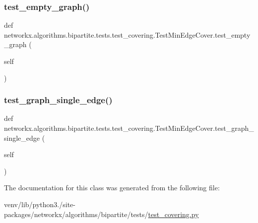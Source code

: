 \subsubsection{\texorpdfstring{test\+\_\+empty\+\_\+graph()}{test\_empty\_graph()}}
{\footnotesize\ttfamily def networkx.\+algorithms.\+bipartite.\+tests.\+test\+\_\+covering.\+Test\+Min\+Edge\+Cover.\+test\+\_\+empty\+\_\+graph (\begin{DoxyParamCaption}\item[{}]{self }\end{DoxyParamCaption})}

\mbox{\label{classnetworkx_1_1algorithms_1_1bipartite_1_1tests_1_1test__covering_1_1TestMinEdgeCover_a5fbfbe9a9518ce4a3f1a5e41b22c2c12}} 
\subsubsection{\texorpdfstring{test\+\_\+graph\+\_\+single\+\_\+edge()}{test\_graph\_single\_edge()}}
{\footnotesize\ttfamily def networkx.\+algorithms.\+bipartite.\+tests.\+test\+\_\+covering.\+Test\+Min\+Edge\+Cover.\+test\+\_\+graph\+\_\+single\+\_\+edge (\begin{DoxyParamCaption}\item[{}]{self }\end{DoxyParamCaption})}



The documentation for this class was generated from the following file\+:\begin{DoxyCompactItemize}
\item 
venv/lib/python3./site-\/packages/networkx/algorithms/bipartite/tests/\hyperlink{bipartite_2tests_2test__covering_8py}{test\+\_\+covering.\+py}\end{DoxyCompactItemize}

